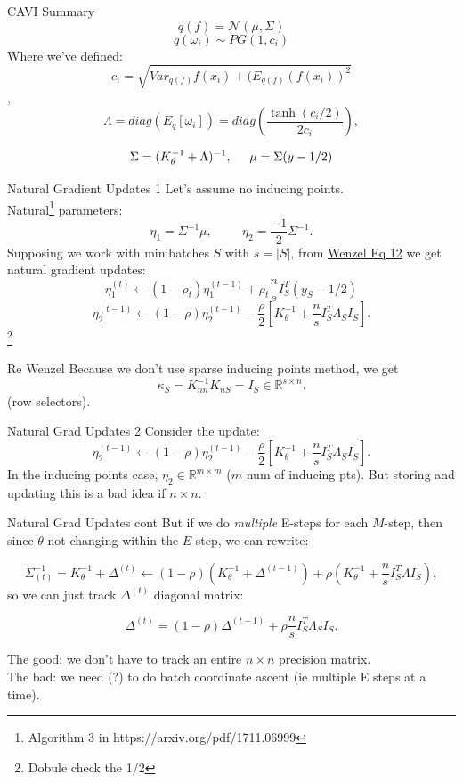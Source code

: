 \documentclass[aspectratio=169,xcolor=dvipsnames]{beamer}
\begin{document}
\begin{frame}{CAVI Summary}
    $$\boxed{q(f) = \mathcal N(\mu, \Sigma)}$$
    $$\boxed{q(\omega_i) \sim PG(1, c_i)}$$
Where we've defined:\\
  $$c_i = \sqrt{Var_{q(f)} f(x_i) + (E_{q(f)} (f(x_i))^2}$$, 
    $$\Lambda = diag(E_q[\omega_i]) = diag(\frac{\tanh (c_i/2)}{2c_i}), $$
  
    $$\Sigma = (K_\theta^{-1} + \Lambda)^{-1}, \hspace{ 0.5 cm} \mu = \Sigma (y-1/2)$$
\end{frame}

\begin{frame}{Natural Gradient Updates 1}
Let's assume no inducing points. \\ 

Natural\footnote{ Algorithm 3 in https://arxiv.org/pdf/1711.06999} parameters:
    $$\eta_1 = \Sigma^{-1} \mu, \hspace{ 1cm} \eta_2 = \frac{-1}{2} \Sigma^{-1} .$$  
   Supposing we work with minibatches $S$ with $s=|S|$, from \href{https://arxiv.org/pdf/1802.06383}{Wenzel Eq 12} we get natural gradient updates:
$$\eta_1^{(t)} \leftarrow (1-\rho_t) \eta_1^{(t-1)} + \rho_t \frac{n}{s} I_S^T (y_S - 1/2)$$
$$\eta_2^{(t-1)} \leftarrow (1-\rho)\eta_2^{(t-1)} -\frac{\rho}{2} \left[K_\theta^{-1} + \frac{n}{s}I_S^T \Lambda_S I_S\right]. $$\footnote{Dobule check the 1/2}
    
\end{frame}
\begin{frame}{Re Wenzel}
    Because we don't use sparse inducing points method, we get $$\kappa_S = K_{nn}^{-1} K_{nS} = I_S \in \mathbb R^{s \times n}.$$
(row selectors). 
\end{frame}
\begin{frame}{Natural Grad Updates 2}
Consider the update:
    $$\eta_2^{(t-1)} \leftarrow (1-\rho)\eta_2^{(t-1)} -\frac{\rho}{2} \left[K_\theta^{-1} + \frac{n}{s}I_S^T \Lambda_S I_S\right].$$
   In the inducing points case, $\eta_2 \in \mathbb R^{m\times m}$ ($m$ num of inducing pts). But storing and updating this is a bad idea if $n\times n$.
\end{frame}
\begin{frame}{Natural Grad Updates cont}
    But if we do \textit{multiple} E-steps for each $M$-step, then since $\theta$ not changing within the $E$-step, we can rewrite:

    $$\Sigma_{(t)}^{-1} = K_\theta^{-1} + \Delta^{(t)} \leftarrow  (1-\rho)(K_\theta^{-1} + \Delta^{(t-1)}) + \rho(K_\theta^{-1} + \frac{n}{s}I_S^T\Lambda I_S),$$
    so we can just track $\Delta^{(t)}$ diagonal matrix:

    $$\Delta^{(t)} = (1-\rho)\Delta^{(t-1)} + \rho \frac{n}{s} I_S^T \Lambda_S I_S.$$

    The good: we don't have to track an entire $n\times n$ precision matrix.\\
    The bad: we need (?) to do batch coordinate ascent (ie multiple E steps at a time).
\end{frame}
\end{document}
